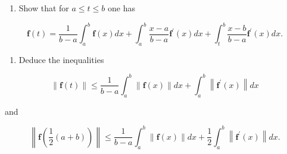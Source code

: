 \begin{enumerate}
\def\labelenumi{\alph{enumi})}
\tightlist
\item
  Show that for \(a \leqslant t \leqslant b\) one has
\end{enumerate}

\[
\mathbf {f} (t) = \frac {1}{b - a} \int_ {a} ^ {b} \mathbf {f} (x) d x + \int_ {a} ^ {b} \frac {x - a}{b - a} \mathbf {f} ^ {\prime} (x) d x + \int_ {t} ^ {b} \frac {x - b}{b - a} \mathbf {f} ^ {\prime} (x) d x.
\]

\begin{enumerate}
\def\labelenumi{\alph{enumi})}
\setcounter{enumi}{1}
\tightlist
\item
  Deduce the inequalities
\end{enumerate}

\[
\| \mathbf {f} (t) \| \leqslant \frac {1}{b - a} \int_ {a} ^ {b} \| \mathbf {f} (x) \| d x + \int_ {a} ^ {b} \left\| \mathbf {f} ^ {\prime} (x) \right\| d x
\]

and

\[
\left\| \mathbf {f} \left(\frac {1}{2} (a + b)\right) \right\| \leqslant \frac {1}{b - a} \int_ {a} ^ {b} \| \mathbf {f} (x) \| d x + \frac {1}{2} \int_ {a} ^ {b} \left\| \mathbf {f} ^ {\prime} (x) \right\| d x.
\]

\setcounter{exercisegroup}{1}
